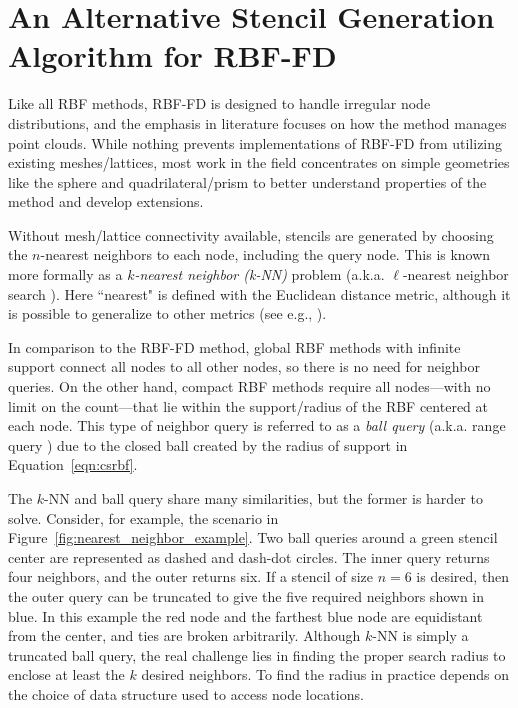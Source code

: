 \documentclass{report}
\begin{document}
\fi




\chapter{An Alternative Stencil Generation Algorithm for RBF-FD}
\label{chap:stencils}

Like all RBF methods, RBF-FD is designed to handle irregular node distributions, and the emphasis in literature focuses on how the method manages point clouds. While nothing prevents implementations of RBF-FD from utilizing existing meshes/lattices, most work in the field concentrates on simple geometries like the sphere \cite{FlyerWright07,FlyerLehto10,FlyerLehto11,FlyerWright09} and quadrilateral/prism \cite{FiNDTHESE} to better understand properties of the method and develop extensions. 


Without mesh/lattice connectivity available, stencils are generated by choosing the $n$-nearest neighbors to each node, including the query node. This is known more formally as a \emph{$k$-nearest neighbor (k-NN)} problem \cite{TagliasacchiMFE} (a.k.a. $\ell$-nearest neighbor search \cite{WendlandBook}). Here ``nearest" is defined with the Euclidean distance metric, although it is possible to generalize to other metrics (see e.g., \cite{MatlabKDTreeSearcher}). 

In comparison to the RBF-FD method, global RBF methods with infinite support connect all nodes to all other nodes, so there is no need for neighbor queries. On the other hand, compact RBF methods require all nodes---with no limit on the count---that lie within the support/radius of the RBF centered at each node. This type of neighbor query is referred to as a \emph{ball query} (a.k.a. range query \cite{WendlandBook}) due to the closed ball created by the radius of support in Equation~\ref{eqn:csrbf}. 

The $k$-NN and ball query share many similarities, but the former is harder to solve. Consider, for example, the scenario in Figure~\ref{fig:nearest_neighbor_example}. Two ball queries around a green stencil center are represented as dashed and dash-dot circles. The inner query returns four neighbors, and the outer returns six. If a stencil of size $n=6$ is desired, then the outer query can be truncated to give the five required neighbors shown in blue. In this example the red node and the farthest blue node are equidistant from the center, and ties are broken arbitrarily. Although $k$-NN is simply a truncated ball query, the real challenge lies in finding the proper search radius to enclose at least the $k$ desired neighbors. To find the radius in practice depends on the choice of data structure used to access node locations. 
\end{document}
